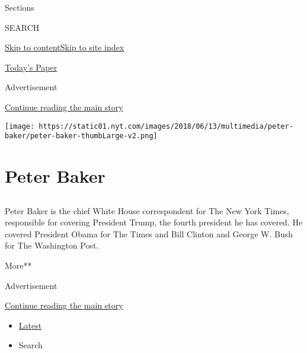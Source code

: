 Sections

SEARCH

\protect\hyperlink{site-content}{Skip to
content}\protect\hyperlink{site-index}{Skip to site index}

\href{https://myaccount.nytimes.com/auth/login?response_type=cookie\&client_id=vi}{}

\href{https://www.nytimes.com/section/todayspaper}{Today's Paper}

Advertisement

\protect\hyperlink{after-top}{Continue reading the main story}

\texttt{[image: https://static01.nyt.com/images/2018/06/13/multimedia/peter-baker/peter-baker-thumbLarge-v2.png]}

\hypertarget{peter-baker}{%
\section{Peter Baker}\label{peter-baker}}

\subsection{}

Peter Baker is the chief White House correspondent for The New York
Times, responsible for covering President Trump, the fourth president he
has covered. He covered President Obama for The Times and Bill Clinton
and George W. Bush for The Washington Post.

More**

Advertisement

\protect\hyperlink{after-mid1}{Continue reading the main story}

\begin{itemize}
\tightlist
\item
  \protect\hyperlink{stream-panel}{Latest}
\item
  Search
\end{itemize}

